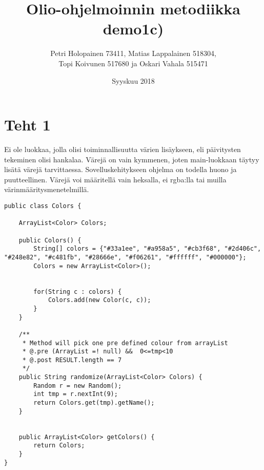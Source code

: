 \documentclass[a4paper,12pt,titlepage]{article}
\title{Olio-ohjelmoinnin metodiikka demo1}
\author{Petri Holopainen 73411, Matias Lappalainen 518304,
\\ Topi Koivunen 517680 ja Oskari Vahala 515471\\[1cm]
}
\date{Syyskuu 2018}
\theoremstyle{definition}
\theoremstyle{remark}
\begin{document}
\maketitle          %


\section{Teht 1}
\title{c)}
\newline
Ei ole luokkaa, jolla olisi toiminnallisuutta värien lisäykseen, eli päivitysten tekeminen olisi hankalaa. Värejä on vain kymmenen, joten main-luokkaan täytyy lisätä värejä tarvittaessa. Sovelluskehitykseen ohjelma on todella huono ja puutteellinen. Värejä voi määritellä vain heksalla, ei rgba:lla tai muilla värinmääritysmenetelmillä.


\renewcommand{\refname}{Kirjallisuutta} %

\newpage

\begin{lstlisting}
public class Colors {

    ArrayList<Color> Colors;

    public Colors() {
        String[] colors = {"#33a1ee", "#a958a5", "#cb3f68", "#2d406c", "#248e82", "#c481fb", "#28666e", "#f06261", "#ffffff", "#000000"};
        Colors = new ArrayList<Color>();


        for(String c : colors) {
            Colors.add(new Color(c, c));
        }
    }

    /**
     * Method will pick one pre defined colour from arrayList
     * @.pre (ArrayList =! null) &&  0<=tmp<10
     * @.post RESULT.length == 7
     */
    public String randomize(ArrayList<Color> Colors) {
        Random r = new Random();
        int tmp = r.nextInt(9);
        return Colors.get(tmp).getName();
    }


    public ArrayList<Color> getColors() {
        return Colors;
    }
}
\end{lstlisting}

\newpage
\end{document}
